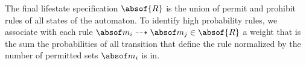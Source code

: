 \documentclass[10pt,reprint,nocopyrightspace,numbers]{sigplanconf}
\begin{document}
The final lifestate specification $\absof{\directiveset}$ is the union of permit 
and prohibit rules of all states of the automaton.
To identify high probability rules, we associate with each rule 
$\absmsg_i\dashrightarrow\absmsg_j \in \absof{\directiveset}$ a weight
that is the sum the probabilities of all transition that define the rule normalized by the 
number of permitted sets $\absmsg_i$ is in.
%	
\end{document}
